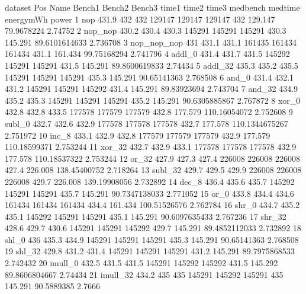 \begin{filecontents}{dataset}
Pos	Name	Bench1	Bench2	Bench3	time1	time2	time3	medbench	medtime	energymWh	power
1	nop	431.9	432	432	129147	129147	129147	432	129.147	79.9678224	2.74752
2	nop\_nop	430.2	430.4	430.3	145291	145291	145291	430.3	145.291	89.6101614633	2.736708
3	nop\_nop\_nop	431	431.1	431.1	161435	161434	161434	431.1	161.434	99.75168294	2.741796
4	addl\_0	431.4	431.7	431.5	145292	145291	145291	431.5	145.291	89.8600619833	2.74434
5	addl\_32	435.3	435.2	435.5	145291	145291	145291	435.3	145.291	90.65141363	2.768508
6	and\_0	431.4	432.1	431.2	145291	145291	145292	431.4	145.291	89.83923694	2.743704
7	and\_32	434.9	435.2	435.3	145291	145291	145291	435.2	145.291	90.6305885867	2.767872
8	xor\_0	432.8	432.8	433.5	177578	177579	177579	432.8	177.579	110.16054072	2.752608
9	subl\_0	432.7	432.6	432.9	177578	177578	177578	432.7	177.578	110.1344675267	2.751972
10	inc\_8	433.1	432.9	432.8	177579	177579	177579	432.9	177.579	110.18599371	2.753244
11	xor\_32	432.7	432.9	433.1	177578	177578	177578	432.9	177.578	110.18537322	2.753244
12	or\_32	427.9	427.3	427.4	226008	226008	226008	427.4	226.008	138.45400752	2.718264
13	subl\_32	429.7	429.5	429.9	226008	226008	226008	429.7	226.008	139.19908056	2.732892
14	dec\_8	436.4	435.6	435.7	145292	145291	145291	435.7	145.291	90.7347138033	2.771052
15	or\_0	433.8	434.4	434.6	161434	161434	161434	434.4	161.434	100.51526576	2.762784
16	shr\_0	434.7	435.2	435.1	145292	145291	145291	435.1	145.291	90.6097635433	2.767236
17	shr\_32	428.6	429.7	430.6	145291	145291	145292	429.7	145.291	89.4852112033	2.732892
18	shl\_0	436	435.3	434.9	145291	145291	145291	435.3	145.291	90.65141363	2.768508
19	shl\_32	429.8	431.2	431.4	145291	145291	145291	431.2	145.291	89.7975868533	2.742432
20	imull\_0	432.5	431.5	431.5	145291	145292	145292	431.5	145.292	89.8606804667	2.74434
21	imull\_32	434.2	435	435	145291	145292	145291	435	145.291	90.5889385	2.7666
\end{filecontents}



